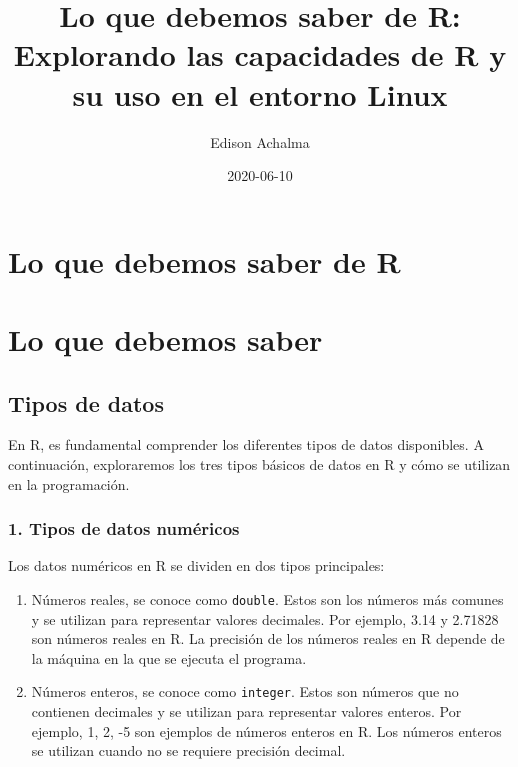 \documentclass[
  jou,
  floatsintext,
  longtable,
  a4paper,
  nolmodern,
  notxfonts,
  notimes,
  colorlinks=true,linkcolor=blue,citecolor=blue,urlcolor=blue]{apa7}
\title{Lo que debemos saber de R: Explorando las capacidades de R y su
uso en el entorno Linux}
\author{Edison Achalma}
\affiliation{
{Escuela Profesional de Economía, Universidad Nacional de San Cristóbal
de Huamanga}}
\date{2020-06-10}
\begin{document}
\maketitle

\hypertarget{toc}{}
\tableofcontents
\newpage
\section[Introduction]{Lo que debemos saber de R}

\setcounter{secnumdepth}{-\maxdimen} %

\setlength\LTleft{0pt}


\section{Lo que debemos saber}\label{lo-que-debemos-saber}

\subsection{Tipos de datos}\label{tipos-de-datos}

En R, es fundamental comprender los diferentes tipos de datos
disponibles. A continuación, exploraremos los tres tipos básicos de
datos en R y cómo se utilizan en la programación.

\subsubsection{1. Tipos de datos
numéricos}\label{tipos-de-datos-numuxe9ricos}

Los datos numéricos en R se dividen en dos tipos principales:

\begin{enumerate}
\def\labelenumi{\alph{enumi}.}
\item
  Números reales, se conoce como \texttt{double}. Estos son los números
  más comunes y se utilizan para representar valores decimales. Por
  ejemplo, 3.14 y 2.71828 son números reales en R. La precisión de los
  números reales en R depende de la máquina en la que se ejecuta el
  programa.
\item
  Números enteros, se conoce como \texttt{integer}. Estos son números
  que no contienen decimales y se utilizan para representar valores
  enteros. Por ejemplo, 1, 2, -5 son ejemplos de números enteros en R.
  Los números enteros se utilizan cuando no se requiere precisión
  decimal.
\end{enumerate}
\end{document}
